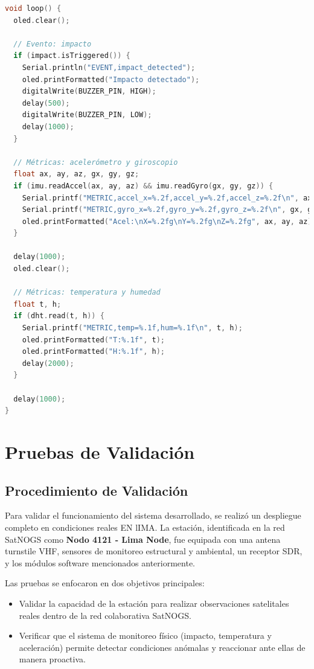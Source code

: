 \documentclass[conference]{IEEEtran}
\begin{document}
\begin{lstlisting}[language=C++, caption={Bucle principal y salida serial para integración con Raspberry Pi}, label={lst:arduino_loop}, basicstyle=\ttfamily\small, breaklines=true]
void loop() {
  oled.clear();

  // Evento: impacto
  if (impact.isTriggered()) {
    Serial.println("EVENT,impact_detected");
    oled.printFormatted("Impacto detectado");
    digitalWrite(BUZZER_PIN, HIGH);
    delay(500);
    digitalWrite(BUZZER_PIN, LOW);
    delay(1000);
  }

  // Métricas: acelerómetro y giroscopio
  float ax, ay, az, gx, gy, gz;
  if (imu.readAccel(ax, ay, az) && imu.readGyro(gx, gy, gz)) {
    Serial.printf("METRIC,accel_x=%.2f,accel_y=%.2f,accel_z=%.2f\n", ax, ay, az);
    Serial.printf("METRIC,gyro_x=%.2f,gyro_y=%.2f,gyro_z=%.2f\n", gx, gy, gz);
    oled.printFormatted("Acel:\nX=%.2fg\nY=%.2fg\nZ=%.2fg", ax, ay, az);
  }

  delay(1000);
  oled.clear();

  // Métricas: temperatura y humedad
  float t, h;
  if (dht.read(t, h)) {
    Serial.printf("METRIC,temp=%.1f,hum=%.1f\n", t, h);
    oled.printFormatted("T:%.1f", t);
    oled.printFormatted("H:%.1f", h);
    delay(2000);
  }

  delay(1000);
}
\end{lstlisting}



\section{Pruebas de Validación}

\subsection{Procedimiento de Validación}

Para validar el funcionamiento del sistema desarrollado, se realizó un despliegue completo en condiciones reales EN lIMA. La estación, identificada en la red SatNOGS como \textbf{Nodo 4121 - Lima Node}, fue equipada con una antena turnstile VHF, sensores de monitoreo estructural y ambiental, un receptor SDR, y los módulos software mencionados anteriormente.

Las pruebas se enfocaron en dos objetivos principales:

\begin{itemize}
  \item Validar la capacidad de la estación para realizar observaciones satelitales reales dentro de la red colaborativa SatNOGS.
  \item Verificar que el sistema de monitoreo físico (impacto, temperatura y aceleración) permite detectar condiciones anómalas y reaccionar ante ellas de manera proactiva.
\end{itemize}
\end{document}
